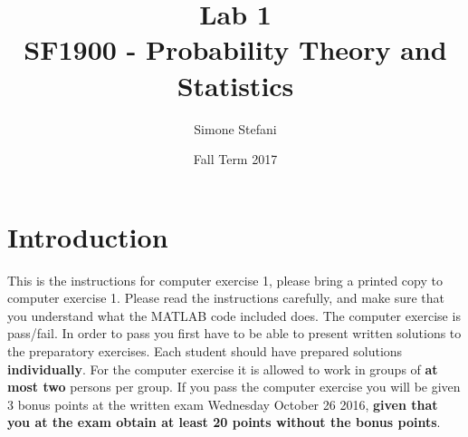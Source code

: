 \documentclass[letterpaper,12pt]{article}
\begin{document}
\title{
    \textbf{Lab 1}\\
    \large{SF1900 - Probability Theory and Statistics}
    }
\author{Simone Stefani}
\date{Fall Term 2017}
\maketitle
\thispagestyle{fancy}

\section*{Introduction}
This is the instructions for computer exercise 1, please bring a printed copy to computer exercise 1. Please read the instructions carefully, and make sure that you understand what the MATLAB code included does. The computer exercise is pass/fail. In order to pass you first have to be able to present written solutions to the preparatory exercises. Each student should have prepared solutions \textbf{individually}. For the computer exercise it is allowed to work in groups of \textbf{at most two} persons per group. If you pass the computer exercise you will be given 3 bonus points at the written exam Wednesday October 26 2016, \textbf{given that you at the exam obtain at least 20 points without the bonus points}.
\end{document}

